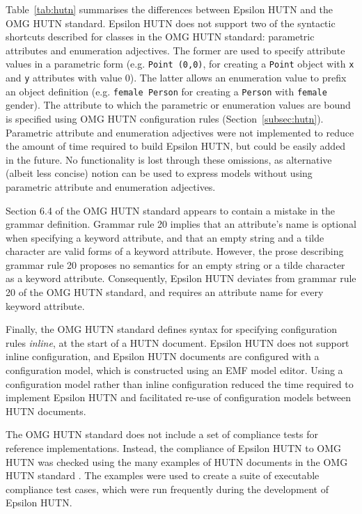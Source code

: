 Table~\ref{tab:hutn} summarises the differences between Epsilon HUTN and the OMG HUTN standard. Epsilon HUTN does not support two of the syntactic shortcuts described for classes in the OMG HUTN standard: parametric attributes and enumeration adjectives. The former are used to specify attribute values in a parametric form (e.g. \texttt{Point (0,0)}, for creating a \texttt{Po\-i\-nt} object with \texttt{x} and \texttt{y} attributes with value 0). The latter allows an enumeration value to prefix an object definition (e.g. \texttt{female Person} for creating a \texttt{Pe\-rs\-on} with \texttt{fe\-ma\-le} gender). The attribute to which the parametric or enumeration values are bound is specified using OMG HUTN configuration rules (Section~\ref{subsec:hutn}). Parametric attribute and enumeration adjectives were not implemented to reduce the amount of time required to build Epsilon HUTN, but could be easily added in the future. No functionality is lost through these omissions, as alternative (albeit less concise) notion can be used to express models without using parametric attribute and enumeration adjectives.

Section 6.4 of the OMG HUTN standard \cite{hutn} appears to contain a mistake in the grammar definition. Grammar rule 20 implies that an attribute's name is optional when specifying a keyword attribute, and that an empty string and a tilde character are valid forms of a keyword attribute. However, the prose describing grammar rule 20 proposes no semantics for an empty string or a tilde character as a keyword attribute. Consequently, Epsilon HUTN deviates from grammar rule 20 of the OMG HUTN standard, and requires an attribute name for every keyword attribute.

Finally, the OMG HUTN standard defines syntax for specifying configuration rules \emph{inline}, at the start of a HUTN document. Epsilon HUTN does not support inline configuration, and Epsilon HUTN documents are configured with a configuration model, which is constructed using an EMF model editor. Using a configuration model rather than inline configuration reduced the time required to implement Epsilon HUTN and facilitated re-use of configuration models between HUTN documents.

The OMG HUTN standard does not include a set of compliance tests for reference implementations. Instead, the compliance of Epsilon HUTN to OMG HUTN was checked using the many examples of HUTN documents in the OMG HUTN standard \cite{hutn}. The examples were used to create a suite of executable compliance test cases, which were run frequently during the development of Epsilon HUTN.
 


